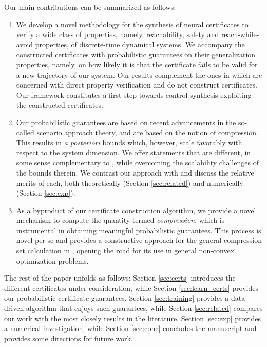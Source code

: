 Our main contributions can be summarized as follows: 
\begin{enumerate}
    \item We develop a novel methodology for the synthesis of neural certificates to verify a wide class of properties, namely, reachability, safety and reach-while-avoid properties, of discrete-time dynamical systems. We accompany the constructed certificates with probabilistic guarantees on their generalization properties, namely, on how likely it is that the certificate fails to be valid for a new trajectory of our system. Our results complement the ones in \cite{DBLP:journals/sttt/BadingsCJJKT22} which are concerned with direct property verification and do not construct certificates. Our framework constitutes a first step towards control synthesis exploiting the constructed certificates.
    \item Our probabilistic guarantees are based on recent advancements in the so-called scenario approach theory, and are based on the notion of compression. This results in \emph{a posteriori} bounds which, however, scale favorably with respect to the system dimension. We offer statements that are different, in some sense complementary to \cite{DBLP:journals/tac/NejatiLJSZ23}, while overcoming the scalability challenges of the bounds therein. We contrast our approach with \cite{DBLP:journals/tac/NejatiLJSZ23} and discuss the relative merits of each, both theoretically (Section \ref{sec:related}) and numerically (Section \ref{sec:exp}).
    \item As a byproduct of our certificate construction algorithm, we provide a novel mechanism to compute the  
quantity termed \emph{compression}, which is instrumental in obtaining meaningful probabilistic guarantees. This process is novel per
se and provides a constructive approach for the general compression set calculation in \cite{DBLP:conf/nips/PaccagnanCG23}, opening the road for its use in general
non-convex optimization problems.
\end{enumerate}
The rest of the paper unfolds as follows: Section \ref{sec:certs} introduces the different certificates under consideration, while Section \ref{sec:learn_certs} provides our probabilistic certificate guarantees. Section \ref{sec:training} provides a data driven algorithm that enjoys such guarantees, while Section 
\ref{sec:related} compares our work with the most closely results in the literature. Section \ref{sec:exp} provides a numerical investigation, while Section \ref{sec:conc} concludes the manuscript and provides some directions for future work.
